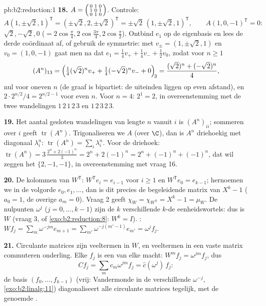\begin{solution}{pb:b2:reduction:1}
\textbf{18.} $A = \begin{psmallmatrix} 0&1&0\\ 1&0&1\\
0&1&0\end{psmallmatrix}$. Controle:
\[
A(1, \pm\sqrt2, 1)^{\mathsf T}
= (\pm\sqrt2, 2, \pm\sqrt2)^{\mathsf T}
= \pm\sqrt2\,(1, \pm\sqrt2, 1)^{\mathsf T},
\qquad
A(1, 0, -1)^{\mathsf T} = 0 :
\]
 $\sqrt2, -\sqrt2, 0$ ($= 2\cos\frac\pi4,
2\cos\frac{3\pi}4, 2\cos\frac\pi2$). Ontbind $e_1$ op de
eigenbasis en lees de derde coördinaat af, of gebruik de symmetrie:
met $v_\pm = (1, \pm\sqrt2, 1)$ en $v_0 = (1, 0, -1)$ gaat men na
dat $e_1 = \frac14 v_+ + \frac14 v_- + \frac12 v_0$, zodat voor $n
\geq 1$
\[
(A^n)_{13} = \Bigl(\tfrac14(\sqrt2)^n v_+ +
\tfrac14(-\sqrt2)^n v_- + 0\Bigr)_{\!3}
= \frac{(\sqrt2)^n + (-\sqrt2)^n}{4},
\]
nul voor oneven $n$ (de graaf is bipartiet: de uiteinden liggen op
even afstand), en $2\cdot 2^{n/2}/4 = 2^{n/2 - 1}$ voor even $n$.
Voor $n = 4$: $2^{1} = 2$, in overeenstemming met de twee
wandelingen $1\,2\,1\,2\,3$ en $1\,2\,3\,2\,3$.

\textbf{19.} Het aantal gesloten wandelingen van lengte $n$ vanuit
$i$ is $(A^n)_{ii}$; sommeren over $i$ geeft
$\operatorname{tr}(A^n)$. Trigonaliseren we $A$ (over $\C$), dan is
$A^n$ driehoekig met diagonaal $\lambda_i^n$:
$\operatorname{tr}(A^n) = \sum_i\lambda_i^n$. Voor de driehoek:
$\operatorname{tr}(A^n) = 3\,\frac{2^n + 2(-1)^n}3 = 2^n +
2(-1)^n = 2^n + (-1)^n + (-1)^n$, dat wil zeggen het  $\{2,
-1, -1\}$, in overeenstemming met vraag 16.

\textbf{20.} De kolommen van $W^{\mathsf T}$: $W^{\mathsf T}e_i =
e_{i-1}$ voor $i \geq 1$ en $W^{\mathsf T}e_0 = e_{k-1}$; hernoemen
we in de volgorde $e_0, e_1, \dots$, dan is dit precies de
begeleidende matrix van $X^k - 1$ ($a_0 = 1$, de overige $a_m =
0$). Vraag 2 geeft $\chi_{W} = \chi_{W^{\mathsf T}} = X^k - 1 =
\mu_{W}$. De nulpunten $\omega^j$ ($j = 0, \dots, k-1$) zijn de $k$
verschillende $k$-de eenheidswortels: dus is $W$
 (vraag 3, of \cref{exo:b2:reduction:8}: $W^k =
I$). : $Wf_j = \sum_m \omega^{-jm}e_{m+1} =
\sum_{m'}\omega^{-j(m'-1)}e_{m'} = \omega^j f_j$.

\textbf{21.} Circulante matrices zijn veeltermen in $W$, en
veeltermen in een vaste matrix commuteren onderling. Elke $f_j$ is
een  van elke macht: $W^m f_j = \omega^{jm}f_j$, dus
\[
Cf_j = \sum_m c_m\omega^{jm} f_j = \widehat c(\omega^j)\,f_j :
\]
de basis $(f_0, \dots, f_{k-1})$ (vrij: Vandermonde in de
verschillende $\omega^{-j}$, \cref{exo:b2:linalg:11})
diagonaliseert alle circulante matrices tegelijk, met de genoemde
.


\end{solution}
